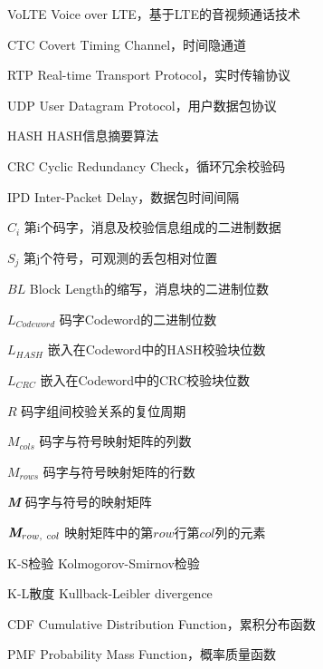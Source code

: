 \begin{denotation}
	
\item[VoLTE] Voice over LTE，基于LTE的音视频通话技术
\item[CTC] Covert Timing Channel，时间隐通道
\item[RTP] Real-time Transport Protocol，实时传输协议
\item[UDP] User Datagram Protocol，用户数据包协议
\item[HASH] HASH信息摘要算法
\item[CRC] Cyclic Redundancy Check，循环冗余校验码
\item[IPD] Inter-Packet Delay，数据包时间间隔
\item[] 
\item[$C_{i}$] 第i个码字，消息及校验信息组成的二进制数据
\item[$S_{j}$] 第j个符号，可观测的丢包相对位置
\item[$BL$] Block Length的缩写，消息块的二进制位数
\item[$L_{Codeword}$] 码字Codeword的二进制位数
\item[$L_{HASH}$] 嵌入在Codeword中的HASH校验块位数
\item[$L_{CRC}$] 嵌入在Codeword中的CRC校验块位数
\item[$R$] 码字组间校验关系的复位周期
\item[$M_{cols}$] 码字与符号映射矩阵的列数
\item[$M_{rows}$] 码字与符号映射矩阵的行数
\item[\textit{\textbf{M}}] 码字与符号的映射矩阵
\item[$\textit{\textbf{M}}_{row,\ col}$] 映射矩阵中的第$row$行第$col$列的元素
\item[] 
\item[K-S检验] Kolmogorov-Smirnov检验
\item[K-L散度] Kullback-Leibler divergence
\item[CDF] Cumulative Distribution Function，累积分布函数
\item[PMF] Probability Mass Function，概率质量函数

\end{denotation}
